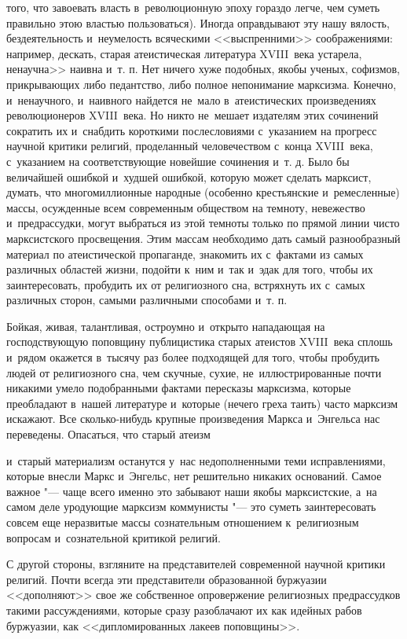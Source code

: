 того, что завоевать власть в~революционную эпоху гораздо легче, чем суметь правильно этою властью пользоваться). Иногда оправдывают эту нашу вялость, бездеятельность и~неумелость всяческими <<выспренними>> соображениями: например, дескать, старая атеистическая литература XVIII~века устарела, ненаучна>> наивна и~т. п. Нет ничего хуже подобных, якобы ученых, софизмов, прикрывающих либо педантство, либо полное непонимание марксизма. Конечно, и~ненаучного, и~наивного найдется не~мало в~атеистических произведениях революционеров XVIII~века. Но никто не~мешает издателям этих сочинений сократить их и~снабдить короткими послесловиями с~указанием на прогресс научной критики религий, проделанный человечеством с~конца XVIII~века, с~указанием на соответствующие новейшие сочинения и~т. д. Было бы величайшей ошибкой и~худшей ошибкой, которую может сделать марксист, думать, что многомиллионные народные (особенно крестьянские и~ремесленные) массы, осужденные всем современным обществом на темноту, невежество и~предрассудки, могут выбраться из этой темноты только по прямой линии чисто марксистского просвещения. Этим массам необходимо дать самый разнообразный материал по атеистической пропаганде, знакомить их с~фактами из самых различных областей жизни, подойти к~ним и~так и~эдак для того, чтобы их заинтересовать, пробудить их от религиозного сна, встряхнуть их с~самых различных сторон, самыми различными способами и~т. п.

Бойкая, живая, талантливая, остроумно и~открыто нападающая на господствующую поповщину публицистика старых атеистов XVIII~века сплошь и~рядом окажется в~тысячу раз более подходящей для того, чтобы пробудить людей от религиозного сна, чем скучные, сухие, не~иллюстрированные почти никакими умело подобранными фактами пересказы марксизма, которые преобладают в~нашей литературе и~которые (нечего греха таить) часто марксизм искажают. Все сколько-нибудь крупные произведения Маркса и~Энгельса нас переведены. Опасаться, что старый атеизм

и~старый материализм останутся у~нас недополненными теми исправлениями, которые внесли Маркс и~Энгельс, нет решительно никаких оснований. Самое важное "--- чаще всего именно это забывают наши якобы марксистские, а~на самом деле уродующие марксизм коммунисты "--- это суметь заинтересовать совсем еще неразвитые массы сознательным отношением к~религиозным вопросам и~сознательной критикой религий.

С другой стороны, взгляните на представителей современной научной критики религий. Почти всегда эти представители образованной буржуазии <<дополняют>> свое же собственное опровержение религиозных предрассудков такими рассуждениями, которые сразу разоблачают их как идейных рабов буржуазии, как <<дипломированных лакеев поповщины>>.


